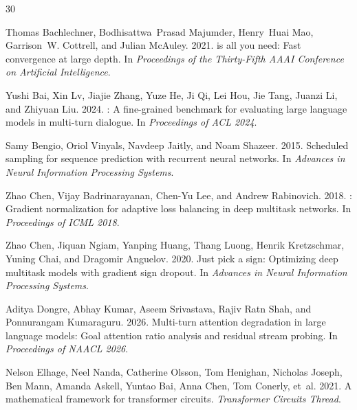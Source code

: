 \documentclass[11pt]{article}
\begin{document}
\begin{thebibliography}{30}

Thomas Bachlechner, Bodhisattwa~Prasad Majumder, Henry~Huai Mao, Garrison~W. Cottrell, and Julian McAuley. 2021.
 is all you need: Fast convergence at large depth.
\newblock In \emph{Proceedings of the Thirty-Fifth AAAI Conference on Artificial Intelligence}.

Yushi Bai, Xin Lv, Jiajie Zhang, Yuze He, Ji Qi, Lei Hou, Jie Tang, Juanzi Li, and Zhiyuan Liu. 2024.
: A fine-grained benchmark for evaluating large language models in multi-turn dialogue.
\newblock In \emph{Proceedings of ACL 2024}.

Samy Bengio, Oriol Vinyals, Navdeep Jaitly, and Noam Shazeer. 2015.
\newblock Scheduled sampling for sequence prediction with recurrent neural networks.
\newblock In \emph{Advances in Neural Information Processing Systems}.

Zhao Chen, Vijay Badrinarayanan, Chen-Yu Lee, and Andrew Rabinovich. 2018.
: Gradient normalization for adaptive loss balancing in deep multitask networks.
\newblock In \emph{Proceedings of ICML 2018}.

Zhao Chen, Jiquan Ngiam, Yanping Huang, Thang Luong, Henrik Kretzschmar, Yuning Chai, and Dragomir Anguelov. 2020.
\newblock Just pick a sign: Optimizing deep multitask models with gradient sign dropout.
\newblock In \emph{Advances in Neural Information Processing Systems}.

Aditya Dongre, Abhay Kumar, Aseem Srivastava, Rajiv Ratn Shah, and Ponnurangam Kumaraguru. 2026.
\newblock Multi-turn attention degradation in large language models: Goal attention ratio analysis and residual stream probing.
\newblock In \emph{Proceedings of NAACL 2026}.

Nelson Elhage, Neel Nanda, Catherine Olsson, Tom Henighan, Nicholas Joseph, Ben Mann, Amanda Askell, Yuntao Bai, Anna Chen, Tom Conerly, et~al. 2021.
\newblock A mathematical framework for transformer circuits.
\newblock \emph{Transformer Circuits Thread}.


\end{thebibliography}
\end{document}

